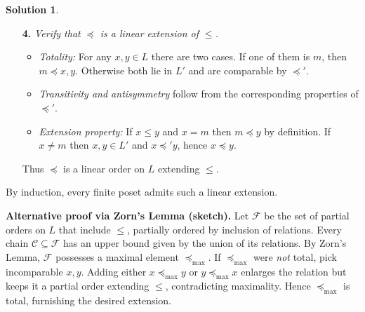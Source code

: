 \documentclass[12pt]{article}
\theoremstyle{definition} %
\newtheorem{solution}{Solution}
\theoremstyle{plain} %
\begin{document}
\begin{solution}
\begin{enumerate}
      \item[\textbf{4.}] \emph{Verify that \(\preceq\) is a linear
            extension of \(\le\).}
            \begin{itemize}
                \item \emph{Totality:}  
                      For any \(x,y\in L\) there are two cases.
                      If one of them is \(m\), then \(m\preceq x,y\).
                      Otherwise both lie in \(L'\) and are comparable by
                      \(\preceq'\).
                \item \emph{Transitivity and antisymmetry} follow from the
                      corresponding properties of \(\preceq'\).
                \item \emph{Extension property:}
                      If \(x\le y\) and \(x=m\) then \(m\preceq y\) by
                      definition.  If \(x\ne m\) then \(x,y\in L'\) and
                      \(x\preceq' y\), hence \(x\preceq y\).
            \end{itemize}
            Thus \(\preceq\) is a linear order on \(L\) extending \(\le\).
  \end{enumerate}
  
  By induction, every finite poset admits such a linear extension.
  
  \medskip
  \textbf{Alternative proof via Zorn’s Lemma (sketch).}
  Let \(\mathcal{F}\) be the set of partial orders on \(L\) that include
  \(\le\), partially ordered by inclusion of relations.
  Every chain \(\mathcal{C}\subseteq\mathcal{F}\) has an upper bound
  given by the union of its relations.  By Zorn’s Lemma,
  \(\mathcal{F}\) possesses a maximal element \(\preceq_{\max}\).
  If \(\preceq_{\max}\) were \emph{not} total, pick incomparable
  \(x,y\).  Adding either \(x\preceq_{\max} y\) or
  \(y\preceq_{\max} x\) enlarges the relation but keeps it a partial
  order extending \(\le\), contradicting maximality.  Hence
  \(\preceq_{\max}\) is total, furnishing the desired extension.
  \end{solution}
\end{document}
